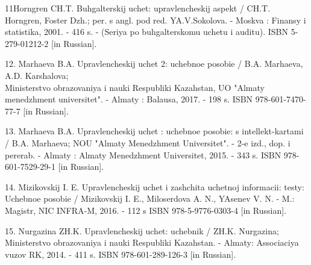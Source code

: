 \begin{references}
11Horngren CH.T. Buhgalterskij uchet: upravlencheskij aspekt / CH.T.
Horngren, Foster Dzh.; per. s angl. pod red. YA.V.Sokolova. - Moskva :
Finansy i statistika, 2001. - 416 s. - (Seriya po buhgalterskomu uchetu
i auditu). ISBN 5-279-01212-2 {[}in Russian{]}.

12. Marhaeva B.A. Upravlencheskij uchet 2: uchebnoe posobie / B.A.
Marhaeva, A.D. Karshalova; \\Ministerstvo obrazovaniya i nauki Respubliki
Kazahstan, UO "Almaty menedzhment universitet". - Almaty : Balausa,
2017. - 198 s. ISBN 978-601-7470-77-7 {[}in Russian{]}.

13. Marhaeva B.A. Upravlencheskij uchet : uchebnoe posobie: s
intellekt-kartami / B.A. Marhaeva; NOU "Almaty Menedzhment Universitet".
- 2-e izd., dop. i pererab. - Almaty : Almaty Menedzhment Universitet,
2015. - 343 s. ISBN 978-601-7529-29-1 {[}in Russian{]}.

14. Mizikovskij I. E. Upravlencheskij uchet i zashchita uchetnoj
informacii: testy: Uchebnoe posobie / Mizikovskij I. E., Miloserdova A.
N., YAsenev V. N. - M.: Magistr, NIC INFRA-M, 2016. - 112 s ISBN
978-5-9776-0303-4 {[}in Russian{]}.

15. Nurgazina ZH.K. Upravlencheskij uchet: uchebnik / ZH.K. Nurgazina;
Ministerstvo obrazovaniya i nauki Respubliki Kazahstan. - Almaty:
Associaciya vuzov RK, 2014. - 411 s. ISBN 978-601-289-126-3 {[}in
Russian{]}.
\end{references}

